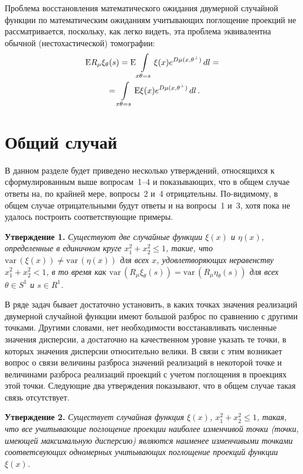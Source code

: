 \begin{multicols}{2}
Проблема восстановления математического
ожидания двумерной случайной функции по математическим ожиданиям
учитывающих поглощение проекций не рассматривается, по\-с\-ко\-ль\-ку, как легко
видеть, эта проблема эквивалентна обычной (нестохастической)
томографии: 
\begin{multline*}
{\rm E}R_\mu\xi_{\theta}(s)={\rm
E}\int\limits_{x\theta=s}\xi(x)e^{D\mu(x,\theta^{\perp})}\,dl={}\\
{}=
\int\limits_{x\theta=s}{\rm
E}\xi(x)e^{D\mu(x,\theta^{\perp})}\,dl\,.
\end{multline*}

\vspace*{-12pt}

\section{Общий случай}

В данном разделе будет приведено
несколько утверждений, относящихся к сформулированным выше вопросам~1--4 и показывающих, что в общем случае ответы
на, по крайней мере, вопросы~2 и~4 отрицательны. По-видимому, в
общем случае отрицательными будут ответы и на вопросы~1 и~3, хотя
пока не удалось построить соответствующие примеры.

\smallskip
\noindent
\textbf{Утверждение 1.} \textit{Существуют две случайные функции $\xi(x)$ и
$\eta(x)$, определенные в единичном круге
$x_{1}^{2}+x_{2}^{2}\leq1$, такие, что $\mathrm{var}\,(\xi(x))\not=\mathrm{var}\,(\eta(x))$ 
для всех $x$, удовлетворяющих неравенству
$x_{1}^{2}+x_{2}^{2}<1$, в то время как $\mathrm{var}\,(R_{\mu}\xi_{\theta}(s))=
\mathrm{var}\,(R_{\mu}\eta_{\theta}(s))$
для всех $\theta\in S^1$ и $s\in R^1$.}

\smallskip

В ряде задач бывает достаточно установить, в каких точках значения
реализаций двумерной случайной функции имеют большой разброс по
сравнению с другими точками. Другими словами, нет необходимости
восстанавливать численные значения дисперсии, а достаточно на
качественном уровне указать те точки, в которых значения дисперсии
относительно велики. В связи с этим возникает вопрос о связи
величины разброса значений реализаций в некоторой точке и
величинами разброса реализаций проекций с учетом поглощения в
проекциях этой точки. Следующие два утверждения показывают, что в
общем случае такая связь отсутствует.

\smallskip

\noindent
\textbf{Утверждение 2.} \textit{Существует случайная функция $\xi(x)$,
$x_1^2+x_2^2\leq 1$, такая, что все учитывающие поглощение
проекции наиболее изменчивой точки (точки, име\-ющей максимальную
дисперсию) являются наименее изменчивыми точками соответсвующих
одномерных учитывающих поглощение проекций функции $\xi(x)$.}


\end{multicols}
